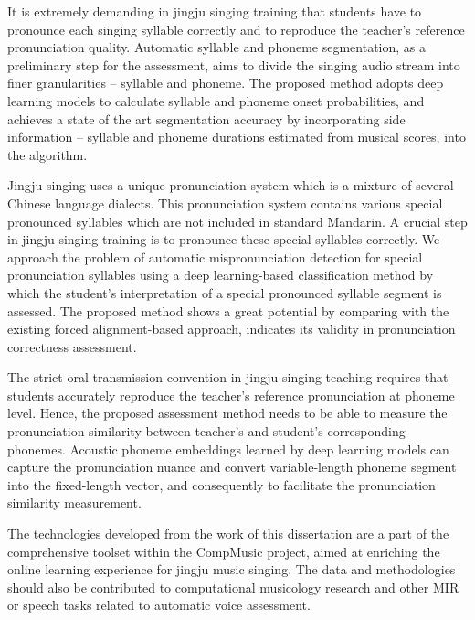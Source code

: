 It is extremely demanding in jingju singing training that students have to pronounce each singing syllable correctly and to reproduce the teacher's reference pronunciation quality. Automatic syllable and phoneme segmentation, as a preliminary step for the assessment, aims to divide the singing audio stream into finer granularities -- syllable and phoneme. The proposed method adopts deep learning models to calculate syllable and phoneme onset probabilities, and achieves a state of the art segmentation accuracy by incorporating side information -- syllable and phoneme durations estimated from musical scores, into the algorithm.

Jingju singing uses a unique pronunciation system which is a mixture of several Chinese language dialects. This pronunciation system contains various special pronounced syllables which are not included in standard Mandarin. A crucial step in jingju singing training is to pronounce these special syllables correctly. We approach the problem of automatic mispronunciation detection for special pronunciation syllables using a deep learning-based classification method by which the student's interpretation of a special pronounced syllable segment is assessed. The proposed method shows a great potential by comparing with the existing forced alignment-based approach, indicates its validity in pronunciation correctness assessment.

The strict oral transmission convention in jingju singing teaching requires that students accurately reproduce the teacher's reference pronunciation at phoneme level. Hence, the proposed assessment method needs to be able to measure the pronunciation similarity between teacher's and student's corresponding phonemes. Acoustic phoneme embeddings learned by deep learning models can capture the pronunciation nuance and convert variable-length phoneme segment into the fixed-length vector, and consequently to facilitate the pronunciation similarity measurement.

The technologies developed from the work of this dissertation are a part of the comprehensive toolset within the CompMusic project, aimed at enriching the online learning experience for jingju music singing. The data and methodologies should also be contributed to computational musicology research and other \gls{MIR} or speech tasks related to automatic voice assessment.


